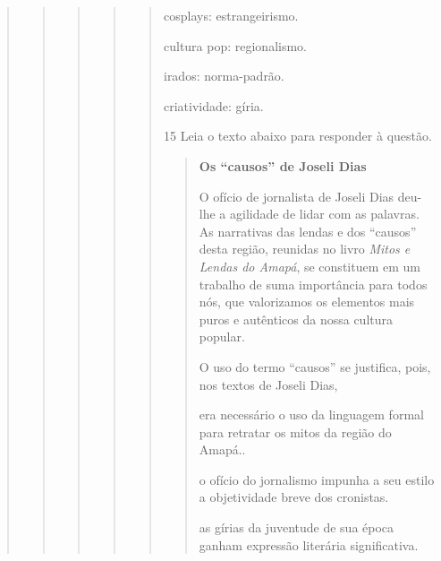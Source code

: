 \begin{quote}
\begin{quote}
\begin{quote}
\begin{quote}
\begin{quote}
\begin{escolha}
  
  \item cosplays: estrangeirismo.
  
  \item cultura pop: regionalismo.
  
  \item irados: norma-padrão.
  
  \item criatividade: gíria.

\end{escolha}


\num{15} Leia o texto abaixo para responder à questão. 

\begin{quote}

\textbf{Os ``causos'' de Joseli Dias}

O ofício de jornalista de Joseli Dias deu-lhe a agilidade de lidar com
as palavras. As narrativas das lendas e dos ``causos'' desta região,
reunidas no livro \textit{Mitos e Lendas do Amapá}, se constituem em um trabalho
de suma importância para todos nós, que valorizamos os elementos mais
puros e autênticos da nossa cultura popular.


O uso do termo ``causos'' se justifica, pois, nos textos de Joseli Dias,

\begin{escolha}
    
    \item era necessário o uso da linguagem formal para retratar os mitos da região do Amapá..
    
    \item o ofício do jornalismo impunha a seu estilo a objetividade breve dos cronistas.
    
    \item as gírias da juventude de sua época ganham expressão literária significativa.
    

\end{escolha}
\end{quote}
\end{quote}
\end{quote}
\end{quote}
\end{quote}
\end{quote}
